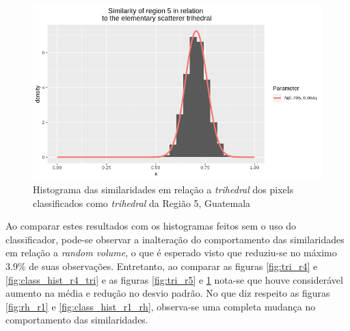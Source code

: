 \documentclass[12pt]{article}
\begin{document}
\begin{figure}[!h]
    \centering    
    \vspace{0.1\linewidth}
    \includegraphics[width = 0.9\linewidth]{../../Images/Report_18_12_20/Classifier_Geo_Dist/Histograms/Guate/region5_tri_sm_filter.png}
    \caption{Histograma das similaridades em relação a \textit{trihedral} dos pixels classificados como \textit{trihedral} da Região 5, Guatemala}
    \label{fig:class_hist_r5_tri}
\end{figure}

Ao comparar estes resultados com os histogramas feitos sem o uso do classificador, pode-se observar a inalteração do comportamento das similaridades em relação a \textit{random volume}, o que é esperado visto que reduziu-se no máximo 3.9\% de suas observações. Entretanto, ao comparar as figuras \ref{fig:tri_r4} e \ref{fig:class_hist_r4_tri} e as figuras \ref{fig:tri_r5} e \ref{fig:class_hist_r5_tri} nota-se que houve considerável aumento na média e redução no desvio padrão. No que diz respeito as figuras \ref{fig:rh_r1} e \ref{fig:class_hist_r1_rh}, observa-se uma completa mudança no comportamento das similaridades.

\newpage



\end{document}
